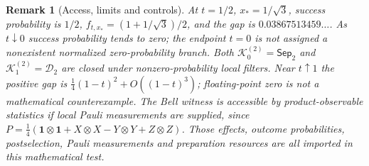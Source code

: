 \documentclass[10pt,letterpaper]{article}
\newtheorem{remark}[theorem]{Remark}
\newcommand{\DD}{\mathcal D}
\newcommand{\SSep}{\mathsf{Sep}}
\newcommand{\KK}{\mathcal K}
\newcommand{\id}{\mathbf 1}
\begin{document}
\begin{remark}[Access, limits and controls]
At $t=1/2$, $x_*=1/\sqrt3$, success probability is $1/2$,
$f_{t,x_*}=(1+1/\sqrt3)/2$, and the gap is $0.03867513459\ldots$.
As $t\downarrow0$ success probability tends to zero; the endpoint
$t=0$ is not assigned a nonexistent normalized zero-probability branch.
Both $\KK_0^{(2)}=\SSep_2$ and $\KK_1^{(2)}=\DD_2$ are closed under
nonzero-probability local filters. Near $t\uparrow1$ the positive gap is
$\frac14(1-t)^2+O((1-t)^3)$; floating-point zero is not a mathematical
counterexample. The Bell witness is accessible by \emph{product-observable
statistics} if local Pauli measurements are supplied, since
$P=\tfrac14(\id\otimes\id+X\otimes X-Y\otimes Y+Z\otimes Z)$.
Those effects, outcome probabilities, postselection, Pauli measurements and
preparation resources are all imported in this mathematical test.
\end{remark}
\end{document}
